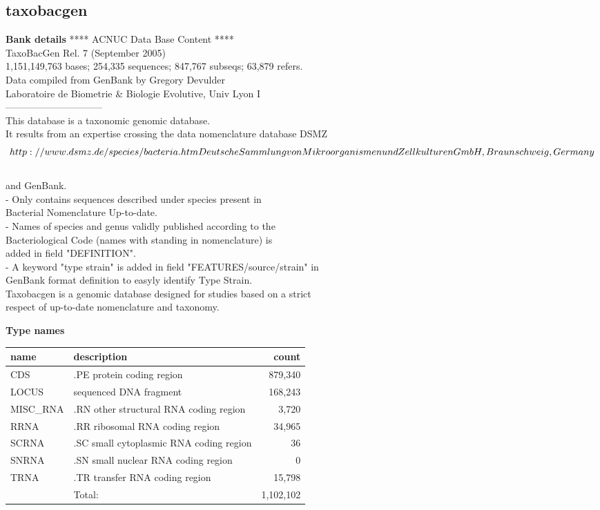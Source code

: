 \documentclass{article}
\begin{document}
\begin{Schunk}
\section{ taxobacgen }
\textbf{Bank details}
               ****     ACNUC Data Base Content      ****\\
                 TaxoBacGen Rel. 7 (September 2005)\\
1,151,149,763 bases; 254,335 sequences; 847,767 subseqs; 63,879 refers.\\
	Data compiled from GenBank by Gregory Devulder \\
        Laboratoire de Biometrie \& Biologie Evolutive, Univ Lyon I\\
------------------------------\\
This database is a taxonomic genomic database. \\
It results from an expertise crossing the data nomenclature database DSMZ\\
\[http://www.dsmz.de/species/bacteria.htm Deutsche Sammlung von\\
Mikroorganismen und Zellkulturen GmbH, Braunschweig, Germany\]\\
and GenBank. \\
- Only contains sequences described under species present in \\
Bacterial Nomenclature Up-to-date.\\
- Names of species and genus validly published according to the\\
Bacteriological Code (names with standing in nomenclature) is \\
added in field "DEFINITION".\\
- A keyword "type strain" is added in field "FEATURES/source/strain" in\\
GenBank format definition to easyly identify Type Strain.\\
Taxobacgen is a genomic database designed for studies based on a strict\\
respect of up-to-date nomenclature and taxonomy.

\textbf{Type names}
\noindent\begin{tabular}{llr}
\hline \hline
name & description & count \\
\hline
CDS  &  .PE protein coding region  &  879,340 \\
LOCUS  &  sequenced DNA fragment  &  168,243 \\
MISC\_RNA  &  .RN other structural RNA coding region  &  3,720 \\
RRNA  &  .RR ribosomal RNA coding region  &  34,965 \\
SCRNA  &  .SC small cytoplasmic RNA coding region  &  36 \\
SNRNA  &  .SN small nuclear RNA coding region  &  0 \\
TRNA  &  .TR transfer RNA coding region  &  15,798 \\
\hline
 & Total: & 1,102,102 \\
\hline \hline
\end{tabular}


\end{Schunk}
\end{document}

